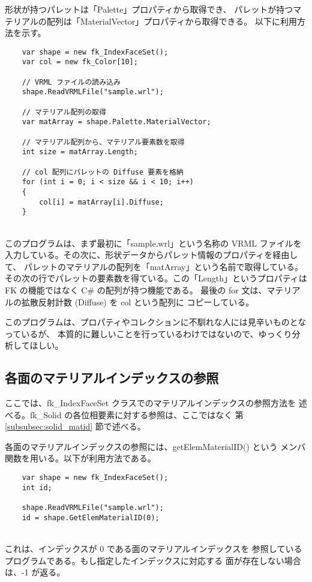 形状が持つパレットは「Palette」プロパティから取得でき、
パレットが持つマテリアルの配列は「MaterialVector」プロパティから取得できる。
以下に利用方法を示す。
\\
\begin{breakbox}
\begin{verbatim}
    var shape = new fk_IndexFaceSet();
    var col = new fk_Color[10];

    // VRML ファイルの読み込み
    shape.ReadVRMLFile("sample.wrl");

    // マテリアル配列の取得
    var matArray = shape.Palette.MaterialVector;

    // マテリアル配列から、マテリアル要素数を取得
    int size = matArray.Length;

    // col 配列にパレットの Diffuse 要素を格納
    for (int i = 0; i < size && i < 10; i++)
    {
        col[i] = matArray[i].Diffuse;
    }
\end{verbatim}
\end{breakbox}
~ \\
このプログラムは、まず最初に「sample.wrl」という名称の VRML ファイルを
入力している。その次に、形状データからパレット情報のプロパティを経由して、
パレットのマテリアルの配列を「matArray」という名前で取得している。
その次の行でパレットの要素数を得ている。この「Length」というプロパティは
FK の機能ではなく C# の配列が持つ機能である。
最後の for 文は、マテリアルの拡散反射計数 (Diffuse) を col という配列に
コピーしている。

このプログラムは、プロパティやコレクションに不馴れな人には見辛いものとなっているが、
本質的に難しいことを行っているわけではないので、ゆっくり分析してほしい。

\subsection{各面のマテリアルインデックスの参照}
ここでは、fk\_IndexFaceSet クラスでのマテリアルインデックスの参照方法を
述べる。fk\_Solid の各位相要素に対する参照は、ここではなく
第 \ref{subsubsec:solid_matid} 節で述べる。

各面のマテリアルインデックスの参照には、getElemMaterialID() という
メンバ関数を用いる。以下が利用方法である。
\\
\begin{breakbox}
\begin{verbatim}
    var shape = new fk_IndexFaceSet();
    int id;

    shape.ReadVRMLFile("sample.wrl");
    id = shape.GetElemMaterialID(0);
\end{verbatim}
\end{breakbox}
~ \\
これは、インデックスが 0 である面のマテリアルインデックスを
参照しているプログラムである。もし指定したインデックスに対応する
面が存在しない場合は、-1 が返る。

